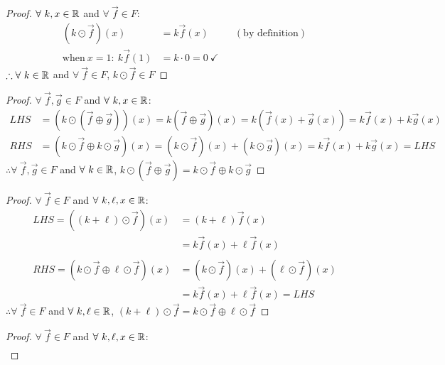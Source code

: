 \begin{enumerate}
  \begin{proof}
    $\forall~k,x \in \mathbb{R}$ and $\forall~\vec{f} \in F$:
    \begin{align*}
      (k \odot \vec{f})(x)         & = k\vec{f}(x)              &  & (\text{by definition}) \\
      \text{when}~x=1:~k\vec{f}(1) & = k \cdot 0 = 0~\checkmark
    \end{align*}
    $\therefore \forall~k \in \mathbb{R}$ and $\forall~\vec{f} \in F$, $k\odot\vec{f} \in F$
  \end{proof}
  \begin{proof}
    $\forall~\vec{f},\vec{g} \in F$ and $\forall~k, x \in \mathbb{R}$:
    \begin{align*}
      LHS & = (k \odot (\vec{f} \oplus \vec{g}))(x) = k(\vec{f} \oplus \vec{g})(x) = k(\vec{f}(x) + \vec{g}(x)) = k\vec{f}(x) + k\vec{g}(x) \\
      RHS & = (k \odot \vec{f} \oplus k \odot \vec{g})(x) = (k \odot \vec{f})(x) + (k \odot \vec{g})(x) = k\vec{f}(x) + k\vec{g}(x) = LHS
    \end{align*}
    $\therefore \forall~\vec{f},\vec{g} \in F$ and $\forall~k \in \mathbb{R}$, $k \odot (\vec{f} \oplus \vec{g}) = k \odot \vec{f} \oplus k \odot \vec{g}$
  \end{proof}
  \begin{proof}
    $\forall~\vec{f} \in F$ and $\forall~k, \ell, x \in \mathbb{R}$:
    \begin{align*}
      LHS = ((k + \ell) \odot \vec{f})(x)                  & = (k+\ell)\vec{f}(x)                             \\
                                                           & = k\vec{f}(x) + \ell\vec{f}(x)                   \\ \\
      RHS = (k \odot \vec{f} \oplus \ell \odot \vec{f})(x) & = (k \odot \vec{f})(x) + (\ell \odot \vec{f})(x) \\
                                                           & = k\vec{f}(x) + \ell\vec{f}(x) = LHS
    \end{align*}
    $\therefore \forall~\vec{f} \in F$ and $\forall~k, \ell \in \mathbb{R}$, $(k + \ell) \odot \vec{f} = k \odot \vec{f} \oplus \ell \odot \vec{f}$
  \end{proof}
  \begin{proof}
    $\forall~\vec{f} \in F$ and $\forall~k, \ell, x \in \mathbb{R}$:
    \begin{align*}

\end{align*}
\end{proof}
\end{enumerate}
